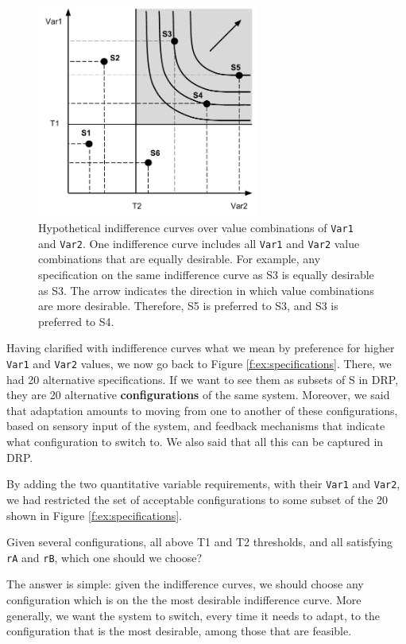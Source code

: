 \documentclass[graybox]{svmult}
\newcommand{\xb}[1]{\textbf{#1}}
\newcommand{\xt}[1]{\texttt{#1}}
\newcommand{\req}[1]{\xt{#1}}
\newcommand{\ZJRP}{DRP}
\begin{document}
\begin{figure}[t]
	\centering
	\includegraphics[height=70mm]{Figures/f-ex-indifference-curves}
\caption{Hypothetical indifference curves over value combinations of \req{Var1} and \req{Var2}. One indifference curve includes all \req{Var1} and \req{Var2} value combinations that are equally desirable. For example, any specification on the same indifference curve as S3 is equally desirable as S3. The arrow indicates the direction in which value combinations are more desirable. Therefore, S5 is preferred to S3, and S3 is preferred to S4.}
\label{f:ex:indifference-curves}
\end{figure}

Having clarified with indifference curves what we mean by preference for higher \req{Var1} and \req{Var2} values, we now go back to Figure \ref{f:ex:specifications}. There, we had 20 alternative specifications. If we want to see them as subsets of S in \ZJRP, they are 20 alternative \xb{configurations} of the same system. Moreover, we said that adaptation amounts to moving from one to another of these configurations, based on sensory input of the system, and feedback mechanisms that indicate what configuration to switch to. We also said that all this can be captured in \ZJRP.

By adding the two quantitative variable requirements, with their \req{Var1} and \req{Var2}, we had restricted the set of acceptable configurations to some subset of the 20 shown in Figure \ref{f:ex:specifications}. 

Given several configurations, all above T1 and T2 thresholds, and all satisfying \req{rA} and \req{rB}, which one should we choose? 

The answer is simple: given the indifference curves, we should choose any configuration which is on the the most desirable indifference curve. More generally, we want the system to switch, every time it needs to adapt, to the configuration that is the most desirable, among those that are feasible. 
\end{document}
